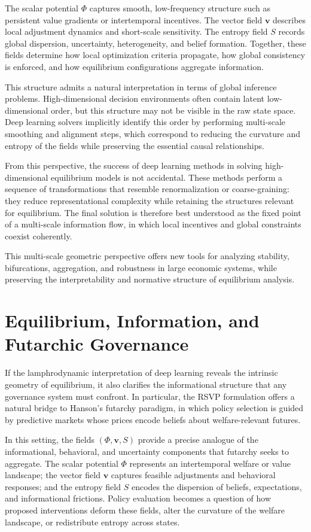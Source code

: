 \documentclass[12pt]{article}
\begin{document}
The scalar potential \(\Phi\) captures smooth, low-frequency structure such as
persistent value gradients or intertemporal incentives.  The vector field
\(\mathbf{v}\) describes local adjustment dynamics and short-scale sensitivity.
The entropy field \(S\) records global dispersion, uncertainty, heterogeneity,
and belief formation.  Together, these fields determine how local optimization
criteria propagate, how global consistency is enforced, and how equilibrium
configurations aggregate information.

This structure admits a natural interpretation in terms of global inference
problems.  High-dimensional decision environments often contain latent
low-dimensional order, but this structure may not be visible in the raw state
space.  Deep learning solvers implicitly identify this order by performing
multi-scale smoothing and alignment steps, which correspond to reducing the
curvature and entropy of the fields while preserving the essential causal
relationships.

From this perspective, the success of deep learning methods in solving
high-dimensional equilibrium models is not accidental.  These methods perform a
sequence of transformations that resemble renormalization or coarse-graining:
they reduce representational complexity while retaining the structures relevant
for equilibrium.  The final solution is therefore best understood as the fixed
point of a multi-scale information flow, in which local incentives and global
constraints coexist coherently.

This multi-scale geometric perspective offers new tools for analyzing stability,
bifurcations, aggregation, and robustness in large economic systems, while
preserving the interpretability and normative structure of equilibrium
analysis.

\section{Equilibrium, Information, and Futarchic Governance}

If the lamphrodynamic interpretation of deep learning reveals the intrinsic
geometry of equilibrium, it also clarifies the informational structure that any
governance system must confront.  In particular, the RSVP formulation offers a
natural bridge to Hanson’s futarchy paradigm, in which policy selection is
guided by predictive markets whose prices encode beliefs about welfare-relevant
futures.

In this setting, the fields \((\Phi,\mathbf{v},S)\) provide a precise analogue
of the informational, behavioral, and uncertainty components that futarchy
seeks to aggregate.  The scalar potential \(\Phi\) represents an intertemporal
welfare or value landscape; the vector field \(\mathbf{v}\) captures feasible
adjustments and behavioral responses; and the entropy field \(S\) encodes the
dispersion of beliefs, expectations, and informational frictions.  Policy
evaluation becomes a question of how proposed interventions deform these
fields, alter the curvature of the welfare landscape, or redistribute entropy
across states.
\end{document}
